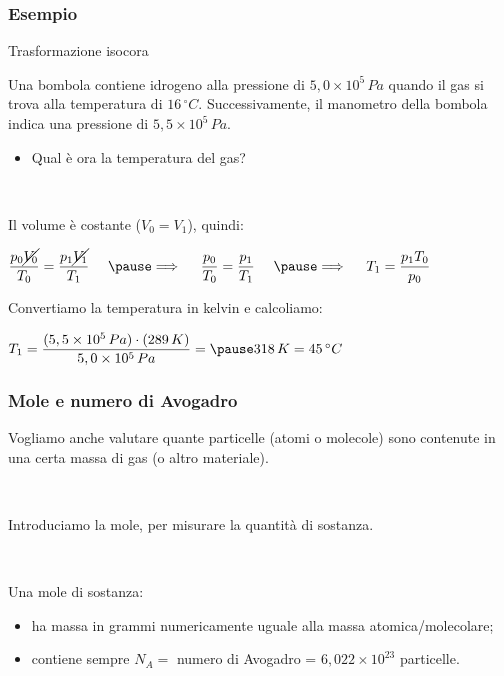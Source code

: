 \documentclass[]{beamer}
\theoremstyle{plain}
\begin{document}
\begin{frame}
\frametitle{Esempio}
\begin{exampleblock}{Trasformazione isocora}
{\small Una bombola contiene idrogeno alla pressione di $ 5,0 \times 10^5 \, Pa $ quando il gas si trova alla temperatura di $ 16 \, ^\circ C $. Successivamente, il manometro della bombola indica una pressione di $ 5,5 \times 10^5 \, Pa $.
\begin{itemize}
  \item Qual è ora la temperatura del gas?
\end{itemize}
}
\end{exampleblock}\pause

~

Il volume è costante ($ V_0 = V_1 $), quindi:
\begin{center}
$ \dfrac{p_0 \cancel{V_0}}{T_0} = \dfrac{p_1 \cancel{V_1}}{T_1} ~~~~\pause \Longrightarrow  ~~~~ \dfrac{p_0}{T_0} = \dfrac{p_1}{T_1}~~~~\pause \Longrightarrow  ~~~~ T_1 = \dfrac{p_1 T_0}{p_0} $
\end{center}\pause
Convertiamo la temperatura in kelvin e calcoliamo:
\begin{center}
$ T_1 = \dfrac{(5,5 \times 10^5 \, Pa) \cdot (289 \, K)}{5,0 \times 10^5 \, Pa} =\pause 318 \, K = 45 \, ^\circ C$
\end{center}
\end{frame}



\begin{frame}
\frametitle{Mole e numero di Avogadro}
Vogliamo anche valutare quante particelle (atomi o molecole) sono contenute in una certa massa di gas (o altro materiale).\pause

~

Introduciamo la \alert<2->{mole}, per misurare la \alert<2>{quantità di sostanza}.\pause

~

Una mole di sostanza:
\begin{itemize}
  \item ha massa in grammi \alert<3>{numericamente uguale alla massa atomica/molecolare};\pause
  \item contiene sempre $ N_A = $ \alert<4>{numero di Avogadro = $ 6,022 \times 10^{23} $} particelle.
\end{itemize}
\end{frame}
\end{document}
